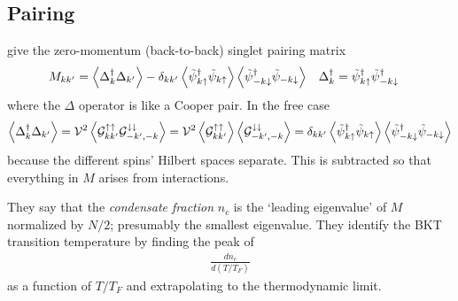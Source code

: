 \subsection{Pairing}\label{sec:pairing}

 give the zero-momentum (back-to-back) singlet pairing matrix
\begin{align}
	M_{kk'} &=
	\left\langle \Delta{}^{\dagger}_k \Delta_{k'} \right\rangle
	-	\delta_{kk'}
		\left\langle \tilde{\psi}{}^{\dagger}_{k\uparrow} \tilde{\psi}_{k\uparrow} \right\rangle
		\left\langle \tilde{\psi}{}^{\dagger}_{-k\downarrow} \tilde{\psi}_{-k\downarrow} \right\rangle
	&
	\Delta{}^{\dagger}_k &= \tilde{\psi}{}^{\dagger}_{k\uparrow} \tilde{\psi}{}^{\dagger}_{-k\downarrow}
\end{align}
where the $\Delta$ operator is like a Cooper pair.
In the free case
\begin{align}
	\left\langle \Delta{}^{\dagger}_k \Delta_{k'} \right\rangle
	=
	\mathcal{V}^2\left\langle  \mathcal{G}^{\uparrow\uparrow}_{kk'} \mathcal{G}^{\downarrow\downarrow}_{-k',-k}  \right\rangle
	=
	\mathcal{V}^2\left\langle  \mathcal{G}^{\uparrow\uparrow}_{kk'}  \right\rangle \left\langle  \mathcal{G}^{\downarrow\downarrow}_{-k',-k}  \right\rangle
	=
	\delta_{kk'}
	\left\langle \tilde{\psi}{}^{\dagger}_{k\uparrow} \tilde{\psi}_{k\uparrow} \right\rangle
	\left\langle \tilde{\psi}{}^{\dagger}_{-k\downarrow} \tilde{\psi}_{-k\downarrow} \right\rangle
\end{align}
because the different spins' Hilbert spaces separate.
This is subtracted so that everything in $M$ arises from interactions.

They say that the \emph{condensate fraction} $n_c$ is the `leading eigenvalue' of $M$ normalized by $N/2$; presumably the smallest eigenvalue.
They identify the BKT transition temperature by finding the peak of
\begin{align}
	\frac{d n_c}{d(T/T_F)}
\end{align}
as a function of $T/T_F$ and extrapolating to the thermodynamic limit.
